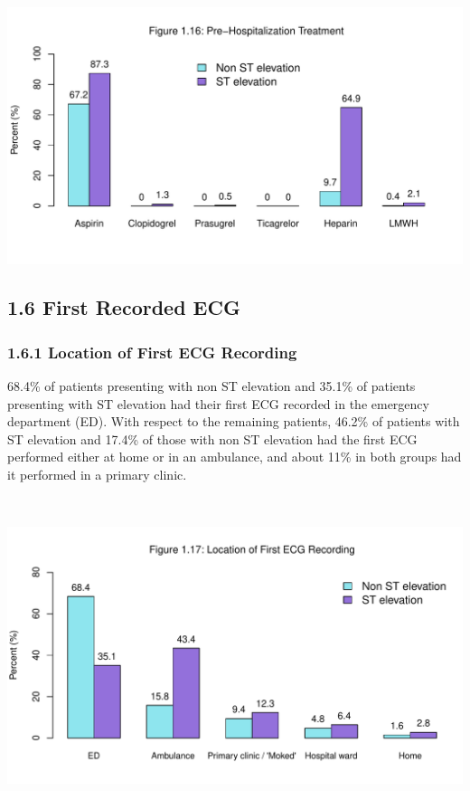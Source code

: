 \documentclass[
]{article}
\begin{document}
\includegraphics{‏‏ACSIS_2024_v1_with_trend_pdf_files/figure-latex/unnamed-chunk-55-1.pdf}

\pagebreak

\subsection{1.6 First Recorded ECG}\label{first-recorded-ecg}

\subsubsection{1.6.1 Location of First ECG
Recording}\label{location-of-first-ecg-recording}

68.4\% of patients presenting with non ST elevation and 35.1\% of
patients presenting with ST elevation had their first ECG recorded in
the emergency department (ED). With respect to the remaining patients,
46.2\% of patients with ST elevation and 17.4\% of those with non ST
elevation had the first ECG performed either at home or in an ambulance,
and about 11\% in both groups had it performed in a primary clinic.

~

\includegraphics{‏‏ACSIS_2024_v1_with_trend_pdf_files/figure-latex/unnamed-chunk-56-1.pdf}
\end{document}
